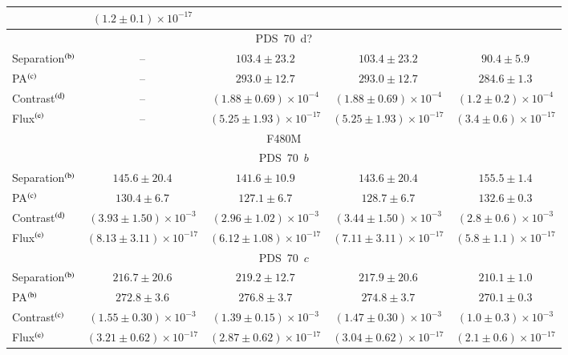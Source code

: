 \documentclass[longauth]{aa}
\begin{document}
\begin{appendix}
\begin{table}
\begin{center}
\begin{tabular}{lcccc}
& $(1.2 \pm 0.1) \times 10^{-17}$ %
\\
\hline
\multicolumn{5}{c}{PDS~70~d?}\\
\hline
Separation$^{\rm (b)}$ &  -- & $103.4 \pm 23.2$ & $103.4 \pm 23.2$ & $90.4 \pm 5.9$ %
\\
PA$^{\rm (c)}$ & -- & $293.0 \pm 12.7$ & $293.0 \pm 12.7$ & $284.6 \pm 1.3$%
\\  %
Contrast$^{\rm (d)}$ & -- & $(1.88 \pm 0.69) \times 10^{-4}$ & $(1.88 \pm 0.69) \times 10^{-4}$ & $(1.2 \pm 0.2) \times 10^{-4}$ %
\\
Flux$^{\rm (e)}$ & -- & $ (5.25 \pm 1.93) \times 10^{-17}$ &  $(5.25 \pm 1.93) \times 10^{-17}$ & $(3.4 \pm 0.6) \times 10^{-17}$ %
\\
\hline
\multicolumn{5}{c}{F480M}\\
\hline
\multicolumn{5}{c}{PDS~70~$b$}\\
\hline
Separation$^{\rm (b)}$ & $145.6 \pm 20.4$ & $141.6 \pm 10.9$ & $143.6 \pm 20.4$ & $155.5 \pm 1.4$ \\
PA$^{\rm (c)}$ & $130.4 \pm 6.7$ & $127.1 \pm 6.7$ & $128.7 \pm 6.7$ & $132.6 \pm 0.3$ \\
Contrast$^{\rm (d)}$ & $(3.93 \pm 1.50) %
\times 10^{-3}$ & $(2.96 \pm 1.02) %
\times 10^{-3}$ & $(3.44 \pm 1.50) %
\times 10^{-3}$ & $(2.8 \pm 0.6) \times 10^{-3}$ \\
Flux$^{\rm (e)}$ & $(8.13 \pm 3.11) %
 \times 10^{-17}$ & $(6.12 \pm 1.08) \times 10^{-17}$ & $(7.11 \pm 3.11) %
\times 10^{-17}$ & $(5.8 \pm 1.1) \times 10^{-17}$\\
\hline
\multicolumn{5}{c}{PDS~70~$c$}\\
\hline
Separation$^{\rm (b)}$ & $216.7 \pm 20.6$ & $219.2 \pm 12.7$ & $217.9 \pm 20.6$ & $210.1 \pm 1.0$\\
PA$^{\rm (b)}$ & $272.8 \pm 3.6$ & $276.8\pm3.7$  & $274.8\pm3.7$ & $270.1 \pm 0.3$ \\  %
Contrast$^{\rm (c)}$ & $(1.55 \pm 0.30)  \times 10^{-3}$ & $(1.39 \pm 0.15) \times 10^{-3}$ & $(1.47 \pm 0.30)  \times 10^{-3}$ & $(1.0 \pm 0.3) \times 10^{-3}$\\
Flux$^{\rm (e)}$ & $(3.21 \pm 0.62) \times 10^{-17}$ & $(2.87 \pm 0.62) \times 10^{-17}$ & $(3.04 \pm 0.62) \times 10^{-17}$ & $(2.1 \pm 0.6) \times 10^{-17}$\\

\end{tabular}
\end{center}
\end{table}
\end{appendix}
\end{document}
